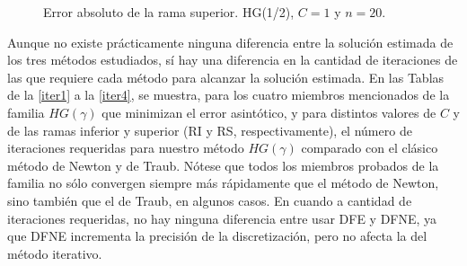 \begin{figure}[h!]
\begin{minipage}[m]{0.38\linewidth}
		\caption{Error absoluto de la rama superior. HG(1/2), $C=1$ y $n=20$.}
		\label{fupper}
	\end{minipage}	
\end{figure}

Aunque no existe prácticamente ninguna diferencia entre la solución estimada de los tres métodos estudiados, sí hay una diferencia en la cantidad de iteraciones de las que requiere cada método para alcanzar la solución estimada. En las Tablas de la \ref{iter1} a la \ref{iter4}, se muestra, para los cuatro miembros mencionados de la familia $HG(\gamma)$ que minimizan el error asintótico, y para distintos valores de $C$ y de las ramas inferior y superior (RI y RS, respectivamente), el número de iteraciones requeridas para nuestro método $HG(\gamma)$ comparado con el clásico método de Newton y de Traub. Nótese que todos los miembros probados de la familia no sólo convergen siempre más rápidamente que el método de Newton, sino también que el de Traub, en algunos casos. En cuando a cantidad de iteraciones requeridas, no hay ninguna diferencia entre usar DFE y DFNE, ya que DFNE incrementa la precisión de la discretización, pero no afecta la del método iterativo.

